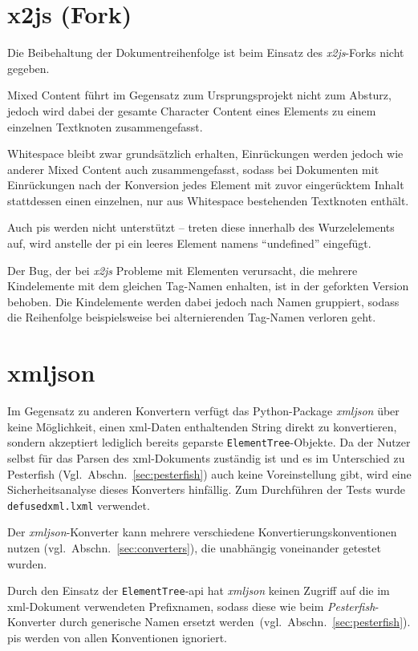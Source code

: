 \section{x2js (Fork)}
\label{sec:x2js-fork}

Die Beibehaltung der Dokumentreihenfolge ist beim Einsatz des \emph{x2js}-Forks nicht gegeben.

Mixed Content führt im Gegensatz zum Ursprungsprojekt nicht zum Absturz, jedoch wird dabei der gesamte Character Content eines Elements zu einem einzelnen Textknoten zusammengefasst.

Whitespace bleibt zwar grundsätzlich erhalten, Einrückungen werden jedoch wie anderer Mixed Content auch zusammengefasst, sodass bei Dokumenten mit Einrückungen nach der Konversion jedes Element mit zuvor eingerücktem Inhalt stattdessen einen einzelnen, nur aus Whitespace bestehenden Textknoten enthält.

Auch \glspl{pi} werden nicht unterstützt -- treten diese innerhalb des Wurzelelements auf, wird anstelle der \gls{pi} ein leeres Element namens \enquote{undefined} eingefügt.

Der Bug, der bei \emph{x2js} Probleme mit Elementen verursacht, die mehrere Kindelemente mit dem gleichen Tag-Namen enhalten, ist in der geforkten Version behoben. Die Kindelemente werden dabei jedoch nach Namen gruppiert, sodass die Reihenfolge beispielsweise bei alternierenden Tag-Namen verloren geht.

\section{xmljson}
\label{sec:xmljson}

Im Gegensatz zu anderen Konvertern verfügt das Python-Package \emph{xmljson} über keine Möglichkeit, einen \acrshort{xml}-Daten enthaltenden String direkt zu konvertieren, sondern akzeptiert lediglich bereits geparste \texttt{ElementTree}-Objekte. Da der Nutzer selbst für das Parsen des \acrshort{xml}-Dokuments zuständig ist und es im Unterschied zu Pesterfish (Vgl.~Abschn.~\ref{sec:pesterfish}) auch keine Voreinstellung gibt, wird eine Sicherheitsanalyse dieses Konverters hinfällig. Zum Durchführen der Tests wurde \texttt{defusedxml.lxml} verwendet.

Der \emph{xmljson}-Konverter kann mehrere verschiedene Konvertierungskonventionen nutzen (vgl.~Abschn.~\ref{sec:converters}), die unabhängig voneinander getestet wurden.

Durch den Einsatz der \texttt{ElementTree}-\acrshort{api} hat \emph{xmljson} keinen Zugriff auf die im \acrshort{xml}-Dokument verwendeten Prefixnamen, sodass diese wie beim \emph{Pesterfish}-Konverter durch generische Namen ersetzt werden~(vgl.~Abschn.~\ref{sec:pesterfish}).
\glspl{pi} werden von allen Konventionen ignoriert.


